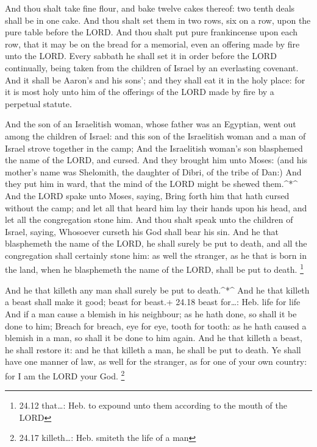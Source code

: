  And thou shalt take fine flour, and bake twelve cakes
thereof: two tenth deals shall be in one cake.  And thou
shalt set them in two rows, six on a row, upon the pure table before the
LORD.  And thou shalt put pure frankincense upon each row,
that it may be on the bread for a memorial, even an offering made by
fire unto the LORD.  Every sabbath he shall set it in order
before the LORD continually, being taken from the children of Israel by
an everlasting covenant.  And it shall be Aaron's and his
sons'; and they shall eat it in the holy place: for it is most holy unto
him of the offerings of the LORD made by fire by a perpetual statute.

 And the son of an Israelitish woman, whose father was an
Egyptian, went out among the children of Israel: and this son of the
Israelitish woman and a man of Israel strove together in the camp;
 And the Israelitish woman's son blasphemed the name of the
LORD, and cursed. And they brought him unto Moses: (and his mother's
name was Shelomith, the daughter of Dibri, of the tribe of Dan:)
 And they put him in ward, that the mind of the LORD might
be shewed them.\^{}*\^{}  And the LORD spake unto Moses,
saying,  Bring forth him that hath cursed without the camp;
and let all that heard him lay their hands upon his head, and let all
the congregation stone him.  And thou shalt speak unto the
children of Israel, saying, Whosoever curseth his God shall bear his
sin.  And he that blasphemeth the name of the LORD, he
shall surely be put to death, and all the congregation shall certainly
stone him: as well the stranger, as he that is born in the land, when he
blasphemeth the name of the LORD, shall be put to death. \footnote{24.12
  that\ldots: Heb. to expound unto them according to the mouth of the
  LORD}

 And he that killeth any man shall surely be put to
death.\^{}*\^{}  And he that killeth a beast shall make it
good; beast for beast.+ 24.18 beast for\ldots: Heb. life for life
 And if a man cause a blemish in his neighbour; as he hath
done, so shall it be done to him;  Breach for breach, eye
for eye, tooth for tooth: as he hath caused a blemish in a man, so shall
it be done to him again.  And he that killeth a beast, he
shall restore it: and he that killeth a man, he shall be put to death.
 Ye shall have one manner of law, as well for the stranger,
as for one of your own country: for I am the LORD your God. \footnote{24.17
  killeth\ldots: Heb. smiteth the life of a man}

